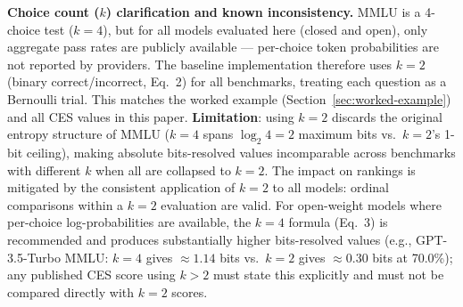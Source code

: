 \documentclass[12pt]{article}
\begin{document}
\noindent\textbf{Choice count ($k$) clarification and known inconsistency.} MMLU is a 4-choice test ($k=4$), but for all models evaluated here (closed and open), only aggregate pass rates are publicly available --- per-choice token probabilities are not reported by providers. The baseline implementation therefore uses $k=2$ (binary correct/incorrect, Eq.~2) for all benchmarks, treating each question as a Bernoulli trial. This matches the worked example (Section~\ref{sec:worked-example}) and all CES values in this paper. \textbf{Limitation}: using $k=2$ discards the original entropy structure of MMLU ($k=4$ spans $\log_2 4 = 2$ maximum bits vs.\ $k=2$'s 1-bit ceiling), making absolute bits-resolved values incomparable across benchmarks with different $k$ when all are collapsed to $k=2$. The impact on rankings is mitigated by the consistent application of $k=2$ to all models: ordinal comparisons within a $k=2$ evaluation are valid. For open-weight models where per-choice log-probabilities are available, the $k=4$ formula (Eq.~3) is recommended and produces substantially higher bits-resolved values (e.g., GPT-3.5-Turbo MMLU: $k=4$ gives $\approx 1.14$ bits vs.\ $k=2$ gives $\approx 0.30$ bits at 70.0\%); any published CES score using $k>2$ must state this explicitly and must not be compared directly with $k=2$ scores.
\end{document}
